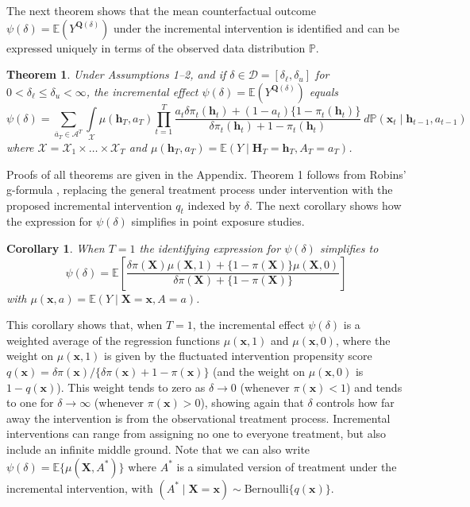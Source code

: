 \documentclass[12pt]{article}
\newcommand{\Pb}{\mathbb{P}}
\newcommand{\E}{\mathbb{E}}
\newcommand{\bX}{\mathbf{X}}
\newcommand{\bx}{\mathbf{x}}
\newcommand{\bH}{\mathbf{H}}
\newcommand{\bh}{\mathbf{h}}
\newcommand{\bQ}{\mathbf{Q}}
\newtheorem{theorem}{Theorem}
\newtheorem{corollary}{Corollary}
\theoremstyle{remark}
\begin{document}
The next theorem shows that the mean counterfactual outcome $\psi(\delta)=\E(Y^{\bQ(\delta)})$ under the incremental intervention is identified and can be expressed uniquely in terms of the observed data distribution $\Pb$. 

\begin{theorem}
\label{thm:ident}
Under Assumptions 1--2, and if $\delta \in \mathcal{D}=[\delta_\ell, \delta_u]$ for $0 < \delta_\ell \leq \delta_u < \infty$, the incremental effect $\psi(\delta)=\E(Y^{\bQ(\delta)})$ equals
$$\psi(\delta) = \!\! \sum_{\overline{a}_T \in \mathcal{A}^T} \int\limits_{\mathcal{X}} \mu(\bh_T,a_T)  \prod_{t=1}^T \frac{a_t \delta \pi_t(\bh_t) + (1-a_t) \{1-\pi_t(\bh_t)\} }{ \delta \pi_t(\bh_t) + 1- \pi_t(\bh_t) } \ d\Pb(\bx_t \mid \bh_{t-1},a_{t-1})   $$
where $\mathcal{X}=\mathcal{X}_1 \times \dots \times \mathcal{X}_T$ and $\mu(\bh_T,a_T)=\E(Y \mid \bH_T=\bh_T,A_T=a_T)$.
\end{theorem}

Proofs of all theorems are given in the Appendix. Theorem 1 follows from Robins' g-formula \autocite{robins1986new}, replacing the general treatment process under intervention with the proposed incremental intervention $q_t$ indexed by $\delta$. The next corollary shows how the expression for $\psi(\delta)$ simplifies in point exposure studies.

\begin{corollary}
When $T=1$ the identifying expression for $\psi(\delta)$ simplifies to
$$ \psi(\delta) = \E \left[ \frac{ \delta \pi(\bX)  \mu(\bX,1) + \{1-\pi(\bX)\} \mu(\bX,0) }{ \delta \pi(\bX) + \{1 - \pi(\bX)\} } \right]  $$
with $\mu(\bx,a)=\E(Y \mid \bX=\bx, A=a)$. 
\end{corollary}

This corollary shows that, when $T=1$, the incremental effect $\psi(\delta)$ is a weighted average of the regression functions $\mu(\bx,1)$ and $\mu(\bx,0)$, where the weight on $\mu(\bx,1)$ is given by the fluctuated intervention propensity score $q(\bx) = \delta \pi(\bx)/\{ \delta \pi(\bx) + 1-\pi(\bx)\}$ (and the weight on $\mu(\bx,0)$ is $1-q(\bx)$). This weight tends to zero as $\delta \rightarrow 0$ (whenever $\pi(\bx)<1$) and tends to one for $\delta \rightarrow \infty$ (whenever $\pi(\bx)>0$), showing again that $\delta$ controls how far away the intervention is from the observational treatment process. Incremental interventions can range from assigning no one to everyone treatment, but also include an infinite middle ground. Note that we can also write $\psi(\delta) = \E\{\mu(\bX,A^*)\}$ where $A^*$ is a simulated version of treatment under the incremental intervention, with $(A^* \mid \bX=\bx) \sim \text{Bernoulli}\{q(\bx)\}$.
\end{document}
